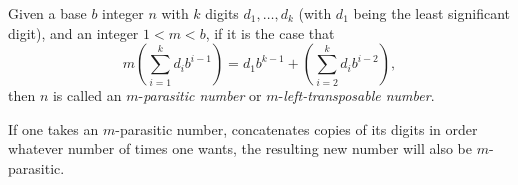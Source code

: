 \documentclass[12pt]{article}
\begin{document}
Given a base $b$ integer $n$ with $k$ digits $d_1, \ldots, d_k$ (with $d_1$ being the least significant digit), and an integer $1 < m < b$, if it is the case that $$m(\sum_{i = 1}^k d_ib^{i - 1}) = d_1b^{k - 1} + (\sum_{i = 2}^k d_ib^{i - 2}),$$ then $n$ is called an $m$-{\em parasitic number} or $m$-{\em left-transposable number}.

If one takes an $m$-parasitic number, concatenates copies of its digits in order whatever number of times one wants, the resulting new number will also be $m$-parasitic.
\end{document}
